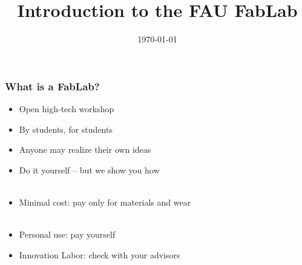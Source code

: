 \documentclass[t]{beamer}
\begin{document}


\date{\today}
\title[Vorstellung]{Introduction to the FAU FabLab}
\author{} %
\frame[plain,c]{\titlepage} %




\begin{frame}
    \frametitle{What is a FabLab?}
    \begin{itemize}
        \item Open high-tech workshop
        \item By students, for students
        \item Anyone may realize their own ideas
        \item Do it yourself -- but we show you how\\~
        \item Minimal cost: pay only for materials and wear\\~
        \item Personal use: pay yourself
        \item Innovation Labor: check with your advisors
    \end{itemize}

\end{frame}
\end{document}
